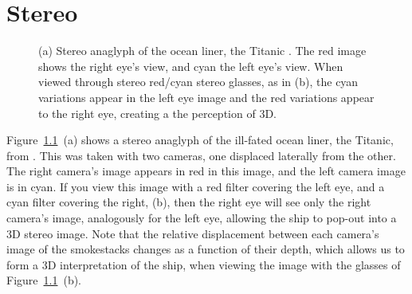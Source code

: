 \chapter{Stereo}


\begin{figure}[t!]
    \centerline{
        }
    \caption{(a) Stereo anaglyph of the ocean liner, the Titanic \cite{McManus2022}.  The red image shows the right eye's view, and cyan the left eye's view.  When viewed through stereo red/cyan stereo glasses, as in (b), the cyan variations appear in the left eye image and the red variations appear to the right eye, creating a the perception of 3D.}
    \label{fig:titanic}
\end{figure}

Figure~\ref{fig:titanic}~(a) shows a stereo anaglyph of the ill-fated ocean liner, the Titanic, from \cite{McManus2022}.  This was taken with two cameras, one displaced laterally from the other.  The right camera's image appears in red in this image, and the left camera image is in cyan.  If you view this image with a red filter covering the left eye, and a cyan filter covering the right, (b), then the right eye will see only the right camera's image, analogously for the left eye, allowing the ship to pop-out into a 3D stereo image.  Note that the relative displacement between each camera's image of the smokestacks changes as a function of their depth, which allows us to form a 3D interpretation of the ship, when viewing the image with the glasses of Figure~\ref{fig:titanic}~(b).


